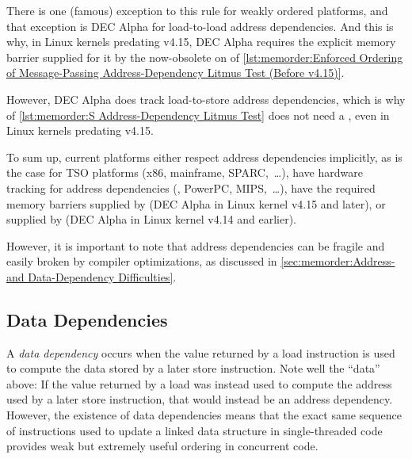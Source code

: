 {{	\begin{fcvref}
	There is one (famous) exception to this rule for weakly ordered
	platforms, and that exception is DEC Alpha for load-to-load
	address dependencies.
	And this is why, in Linux kernels predating v4.15, DEC Alpha
	requires the explicit memory barrier supplied for it by the
	now-obsolete  on  of
	\cref{lst:memorder:Enforced Ordering of Message-Passing Address-Dependency Litmus Test (Before v4.15)}.
	\end{fcvref}
	\begin{fcvref}
	However, DEC Alpha does track load-to-store address dependencies,
	which is why  of
	\cref{lst:memorder:S Address-Dependency Litmus Test}
	does not need a , even in Linux
	kernels predating v4.15.
	\end{fcvref}

	To sum up, current platforms either respect address dependencies
	implicitly, as is the case for TSO platforms (x86, mainframe,
	SPARC,~\dots), have hardware tracking for address dependencies
	(\ARM, PowerPC, MIPS,~\dots), have the required memory barriers
	supplied by  (DEC Alpha in Linux kernel v4.15 and
	later), or supplied by
	 (DEC Alpha in Linux kernel v4.14 and earlier).
}\QuickQuizEndB
%
\QuickQuizEndE
}

However, it is important to note that address dependencies can
be fragile and easily broken by compiler optimizations, as discussed in
\cref{sec:memorder:Address- and Data-Dependency Difficulties}.

\subsection{Data Dependencies}
\label{sec:memorder:Data Dependencies}

A \emph{data dependency} occurs when the value returned by a load
instruction is used to compute the data stored by a later store
instruction.
Note well the ``data'' above:
If the value returned by a load was instead used to compute the address
used by a later store instruction, that would instead be an address
dependency.
However, the existence of data dependencies means that the exact same
sequence of instructions used to update a linked data structure in
single-threaded code provides weak but extremely useful ordering in
concurrent code.

